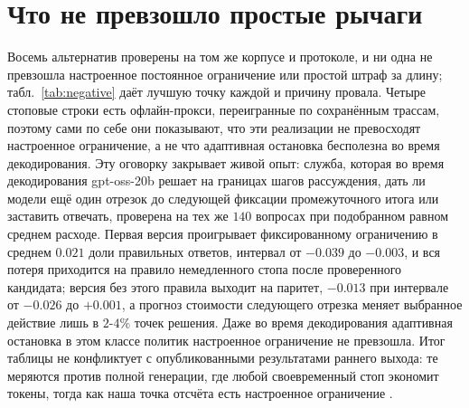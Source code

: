 \documentclass[11pt]{article}
\begin{document}
\section{Что не превзошло простые рычаги}
\label{sec:negative}

Восемь альтернатив проверены на том же корпусе и протоколе, и ни одна не превзошла настроенное постоянное ограничение или простой штраф за длину; табл.~\ref{tab:negative} даёт лучшую точку каждой и причину провала. Четыре стоповые строки есть офлайн-прокси, переигранные по сохранённым трассам, поэтому сами по себе они показывают, что эти реализации не превосходят настроенное ограничение, а не что адаптивная остановка бесполезна во время декодирования. Эту оговорку закрывает живой опыт: служба, которая во время декодирования gpt-oss-20b решает на границах шагов рассуждения, дать ли модели ещё один отрезок до следующей фиксации промежуточного итога или заставить отвечать, проверена на тех же $140$ вопросах при подобранном равном среднем расходе. Первая версия проигрывает фиксированному ограничению в среднем $0.021$ доли правильных ответов, интервал от $-0.039$ до $-0.003$, и вся потеря приходится на правило немедленного стопа после проверенного кандидата; версия без этого правила выходит на паритет, $-0.013$ при интервале от $-0.026$ до $+0.001$, а прогноз стоимости следующего отрезка меняет выбранное действие лишь в $2$-$4\%$ точек решения. Даже во время декодирования адаптивная остановка в этом классе политик настроенное ограничение не превзошла. Итог таблицы не конфликтует с опубликованными результатами раннего выхода: те меряются против полной генерации, где любой своевременный стоп экономит токены, тогда как наша точка отсчёта есть настроенное ограничение \citep{yang2025deer,jurayj2025final}.
\end{document}
